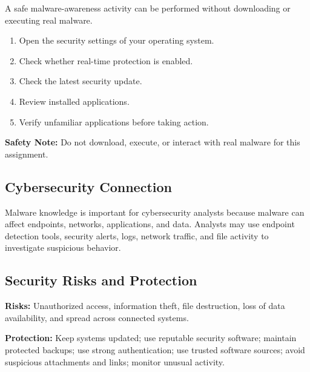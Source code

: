 \documentclass[12pt,a4paper]{article}
\begin{document}
A safe malware-awareness activity can be performed without downloading or executing real malware.

\begin{enumerate}
    \item Open the security settings of your operating system.
    \item Check whether real-time protection is enabled.
    \item Check the latest security update.
    \item Review installed applications.
    \item Verify unfamiliar applications before taking action.
\end{enumerate}

\textbf{Safety Note:} Do not download, execute, or interact with real malware for this assignment.


\subsection{Cybersecurity Connection}

Malware knowledge is important for cybersecurity analysts because malware can affect endpoints, networks, applications, and data. Analysts may use endpoint detection tools, security alerts, logs, network traffic, and file activity to investigate suspicious behavior.


\subsection{Security Risks and Protection}

\textbf{Risks:} Unauthorized access, information theft, file destruction, loss of data availability, and spread across connected systems.

\textbf{Protection:} Keep systems updated; use reputable security software; maintain protected backups; use strong authentication; use trusted software sources; avoid suspicious attachments and links; monitor unusual activity.

\end{document}
